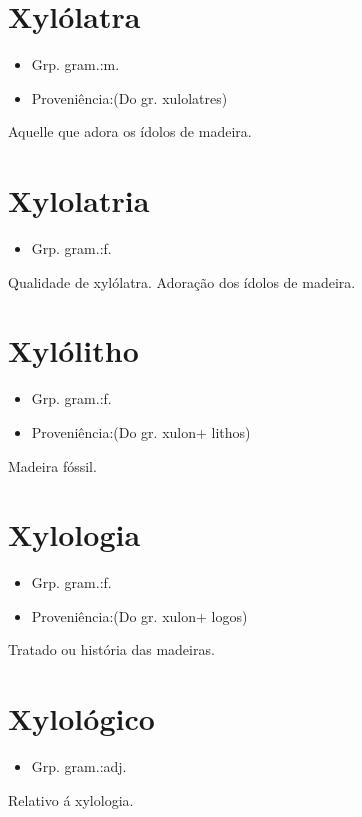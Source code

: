 \section{Xylólatra}
\begin{itemize}
\item {Grp. gram.:m.}
\end{itemize}
\begin{itemize}
\item {Proveniência:(Do gr. \textunderscore xulolatres\textunderscore )}
\end{itemize}
Aquelle que adora os ídolos de madeira.
\section{Xylolatria}
\begin{itemize}
\item {Grp. gram.:f.}
\end{itemize}
Qualidade de xylólatra.
Adoração dos ídolos de madeira.
\section{Xylólitho}
\begin{itemize}
\item {Grp. gram.:f.}
\end{itemize}
\begin{itemize}
\item {Proveniência:(Do gr. \textunderscore xulon\textunderscore  + \textunderscore lithos\textunderscore )}
\end{itemize}
Madeira fóssil.
\section{Xylologia}
\begin{itemize}
\item {Grp. gram.:f.}
\end{itemize}
\begin{itemize}
\item {Proveniência:(Do gr. \textunderscore xulon\textunderscore  + \textunderscore logos\textunderscore )}
\end{itemize}
Tratado ou história das madeiras.
\section{Xylológico}
\begin{itemize}
\item {Grp. gram.:adj.}
\end{itemize}
Relativo á xylologia.
